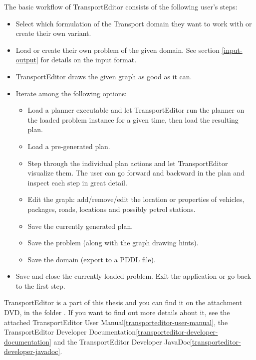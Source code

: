 The basic workflow of TransportEditor consists of the following user's steps:
\begin{itemize}
\item Select which formulation of the Transport domain they want to work with or create their own variant.
\item Load or create their own problem of the given domain. See section \ref{input-output} for details on the input format.
\item TransportEditor draws the given graph as good as it can.
\item Iterate among the following options:
\begin{itemize}
\item Load a planner executable and let TransportEditor run the planner on the loaded problem instance for a given time, then load the resulting plan.
\item Load a pre-generated plan.
\item Step through the individual plan actions and let TransportEditor visualize them.
The user can go forward and backward in the plan and inspect each step in great detail.
\item Edit the graph: add/remove/edit the location or properties of vehicles, packages, roads, locations and possibly petrol stations.
\item Save the currently generated plan.
\item Save the problem (along with the graph drawing hints).
\item Save the domain (export to a PDDL file).
\end{itemize}
\item Save and close the currently loaded problem. Exit the application or go back to the first step.
\end{itemize}

TransportEditor is a part of this thesis and you can find it on the attachment DVD, in the folder . If you want to find out more details about it, see the attached TransportEditor User Manual\ref{transporteditor-user-manual},
the TransportEditor Developer Documentation\ref{transporteditor-developer-documentation}
and the TransportEditor Developer JavaDoc\ref{transporteditor-developer-javadoc}.



